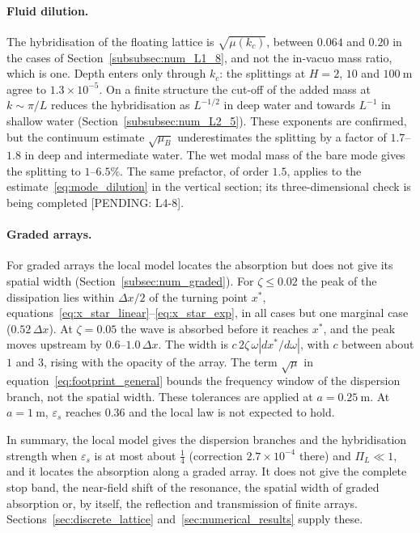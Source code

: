 {\paragraph{Fluid dilution.} The hybridisation of the floating lattice is $\sqrt{\mu(k_c)}$, between $0.064$ and $0.20$ in the cases of Section~\ref{subsubsec:num_L1_8}, and not the in-vacuo mass ratio, which is one. Depth enters only through $k_c$: the splittings at $H=2$, $10$ and $100~\si{\meter}$ agree to $1.3\times10^{-5}$. On a finite structure the cut-off of the added mass at $k\sim\pi/L$ reduces the hybridisation as $L^{-1/2}$ in deep water and towards $L^{-1}$ in shallow water (Section~\ref{subsubsec:num_L2_5}). These exponents are confirmed, but the continuum estimate $\sqrt{\mu_B}$ underestimates the splitting by a factor of $1.7$--$1.8$ in deep and intermediate water. The wet modal mass of the bare mode gives the splitting to $1$--$6.5\%$. The same prefactor, of order $1.5$, applies to the estimate~\eqref{eq:mode_dilution} in the vertical section; its three-dimensional check is being completed [PENDING: L4-8].

\paragraph{Graded arrays.} For graded arrays the local model locates the absorption but does not give its spatial width (Section~\ref{subsec:num_graded}). For $\zeta\le0.02$ the peak of the dissipation lies within $\Delta x/2$ of the turning point $x^*$, equations~\eqref{eq:x_star_linear}--\eqref{eq:x_star_exp}, in all cases but one marginal case ($0.52\,\Delta x$). At $\zeta=0.05$ the wave is absorbed before it reaches $x^*$, and the peak moves upstream by $0.6$--$1.0\,\Delta x$. The width is $c\,2\zeta\,\omega|dx^*/d\omega|$, with $c$ between about $1$ and $3$, rising with the opacity of the array. The term $\sqrt{\mu}$ in equation~\eqref{eq:footprint_general} bounds the frequency window of the dispersion branch, not the spatial width. These tolerances are applied at $a=0.25~\si{\meter}$. At $a=1~\si{\meter}$, $\varepsilon_s$ reaches $0.36$ and the local law is not expected to hold.

In summary, the local model gives the dispersion branches and the hybridisation strength when $\varepsilon_s$ is at most about $\tfrac14$ (correction $2.7\times10^{-4}$ there) and $\Pi_L\ll1$, and it locates the absorption along a graded array. It does not give the complete stop band, the near-field shift of the resonance, the spatial width of graded absorption or, by itself, the reflection and transmission of finite arrays. Sections~\ref{sec:discrete_lattice} and~\ref{sec:numerical_results} supply these.

}

